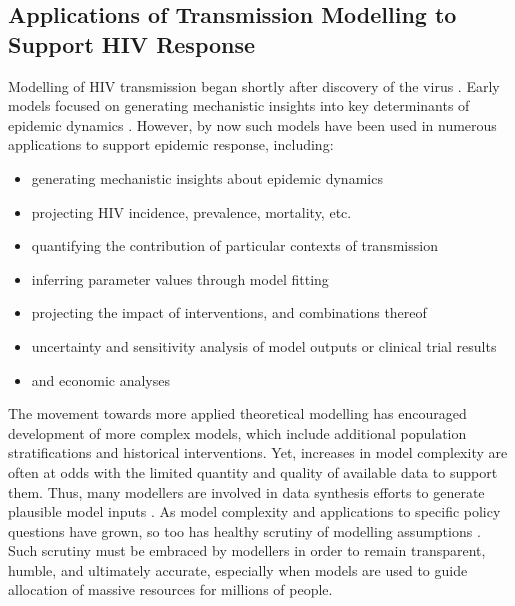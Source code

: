 \subsection{Applications of Transmission Modelling to Support HIV Response}\label{intro.model.apps}
Modelling of HIV transmission began shortly after discovery of the virus \cite{Anderson1986}.
Early models focused on generating mechanistic insights into
key determinants of epidemic dynamics \cite{Isham1988,Garnett1996}.
However, by now such models have been used in
numerous applications to support epidemic response, including:
\begin{itemize}
  \item generating mechanistic insights about epidemic dynamics
        \cite{Garnett1993,Eaton2014ahi,Knight2020}
  \item projecting HIV incidence, prevalence, mortality, etc.
        \cite{Bao2012,Eaton2015}
  \item quantifying the contribution of particular contexts of transmission
        \cite{Mukandavire2018,Silhol2021}
  \item inferring parameter values through model fitting
        \cite{Bellan2015,Johnson2016mf}
  \item projecting the impact of interventions, and combinations thereof
        \cite{Eaton2012,Mishra2014art,Maheu-Giroux2017}
  \item uncertainty and sensitivity analysis of model outputs
        \cite{Blower1994,Hontelez2013,Johnson2016cc,Bernard2017}
        or clinical trial results
        \cite{Cori2014}
  \item and economic analyses
        \cite{Anderson2014,Kerr2015,Phillips2022}
\end{itemize}
The movement towards more applied \vs theoretical modelling
has encouraged development of more complex models,
which include additional population stratifications and historical interventions.
Yet, increases in model complexity are often at odds with
the limited quantity and quality of available data to support them.
Thus, many modellers are involved in data synthesis efforts to generate plausible model inputs
\cite{Boily2009,Bellan2015,Owen2020,Giguere2021}.
As model complexity and applications to specific policy questions have grown,
so too has healthy scrutiny of modelling assumptions \cite{Mishra2014mot,Eaton2015,Geffen2018}.
Such scrutiny must be embraced by modellers in order to
remain transparent, humble, and ultimately accurate,
especially when models are used to guide allocation of massive resources for millions of people.
